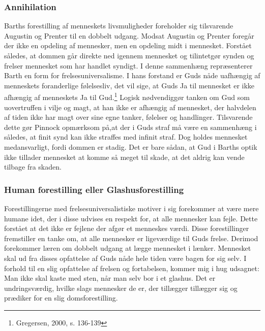 \subsubsection{Annihilation}
Barths forestilling af menneskets livsmuligheder foreholder sig tilsvarende Augustin og Prenter til en dobbelt udgang. Modsat Augustin og Prenter foregår der ikke en opdeling af mennesker, men en opdeling midt i mennesket. Forstået således, at dommen går direkte ned igennem mennesket og tilintetgør synden og frelser mennesket som har handlet syndigt. I denne sammenhæng repræsenterer Barth en form for frelsesuniversalisme. I hans forstand er Guds nåde uafhængig af menneskets foranderlige følelsesliv, det vil sige, at Guds Ja til mennesket er ikke afhængig af menneskets Ja til Gud.\footnote {Gregersen, 2000, s. 136-139} Logisk nødvendiggør tanken om Gud som uovertruffen i vilje og magt, at han ikke er afhængig af mennesket, der halvdelen af tiden ikke har magt over sine egne tanker, følelser og handlinger. Tilsvarende dette gør Pinnock opmærksom på,at der i Guds straf må være en sammenhæng i således, at finit synd kan ikke straffes med infinit straf. Dog holdes mennesket medansvarligt, fordi dommen er stadig. Det er bare sådan, at Gud i Barths optik ikke tillader mennesket at komme så meget til skade, at det aldrig kan vende tilbage fra skaden. 

\subsubsection{Human forestilling eller Glashusforestilling}
Forestillingerne med frelsesuniversalistiske motiver i sig forekommer at være mere humane idet, der i disse udvises en respekt for, at alle mennesker kan fejle. Dette forstået at det ikke er fejlene der afgør et menneskes værdi. Disse forestillinger fremstiller en tanke om, at alle mennesker er ligeværdige til Guds frelse. Derimod forekommer læren om dobbelt udgang at lægge mennesket i lænker. Mennesket skal ud fra disses opfattelse af Guds nåde hele tiden være bagen for sig selv. I forhold til en slig opfattelse af frelsen og fortabelsen, kommer mig i hug udsagnet: Man ikke skal kaste med sten, når man selv bor i et glashus. Det er undringsværdig, hvilke slags mennesker de er, der tillægger tillægger sig og prædiker for en slig domsforestilling.